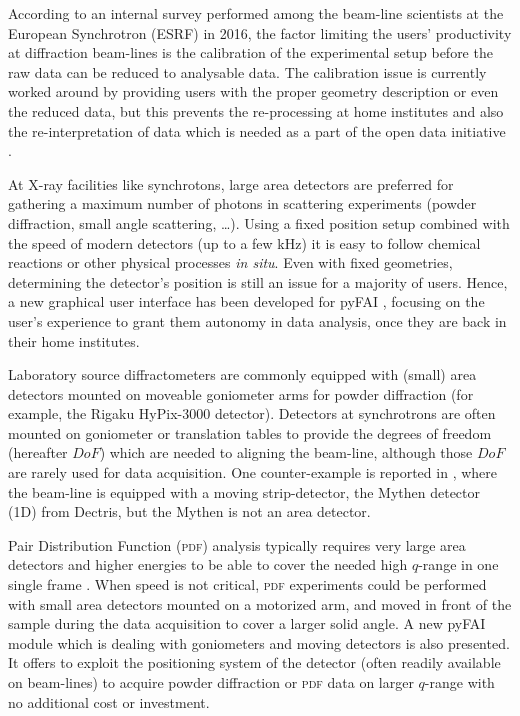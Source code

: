 \documentclass[preprint]{iucr}              %
\begin{document}
According to an internal survey performed among the beam-line scientists at
the European Synchrotron (ESRF) in 2016, the factor limiting the users'
productivity at diffraction beam-lines is the calibration of the experimental
setup before the raw data can be reduced to analysable data.
The calibration issue is currently worked around by providing users with the
proper geometry description or even the reduced data, but this prevents the
re-processing at home institutes and also the re-interpretation of data which
is needed as a part of the open data initiative \cite{Wilkinson2016}.

At X-ray facilities like synchrotons, large area detectors are 
preferred for gathering a maximum number of photons in
scattering experiments (powder diffraction, small angle
scattering, \ldots).
Using a fixed position setup combined with the speed of modern detectors (up
to a few kHz) it is easy to follow chemical reactions or other physical processes \textit{in situ}.
Even with fixed geometries, determining the detector's position is
still an issue for a majority of users. 
Hence, a new graphical user interface has been developed for pyFAI
\cite{pyFAI_0.18}, focusing on the user's experience to grant them autonomy in
data analysis, once they are back in their home institutes.

Laboratory source diffractometers
are commonly equipped with (small) area detectors mounted on moveable goniometer
arms for powder diffraction (for example, the Rigaku HyPix-3000 detector).
Detectors at synchrotrons are often mounted on goniometer or
translation tables to provide the degrees of freedom (hereafter $DoF$) which are 
needed to aligning the beam-line, although those $DoF$ are rarely used for data acquisition.
One counter-example is reported in \cite{Gao:kc5032}, where the beam-line
is equipped with a moving strip-detector, the Mythen detector (1D) from Dectris,
but the Mythen is not an area detector.




Pair Distribution Function (\textsc{pdf}) analysis typically requires very large area
detectors and higher energies to be able to cover the needed high $q$-range in
one single frame \cite{Chupas:wf5000}.
When speed is not critical, \textsc{pdf} experiments could be performed
with small area detectors mounted on a motorized arm, and moved in front of
the sample during the data acquisition to cover a larger solid angle. 
A new pyFAI module which is dealing with goniometers and moving detectors is also presented.
It offers to exploit the positioning system of the detector 
(often readily available on beam-lines) to acquire powder diffraction or \textsc{pdf} data 
on larger $q$-range with no additional cost or investment.
\end{document}
